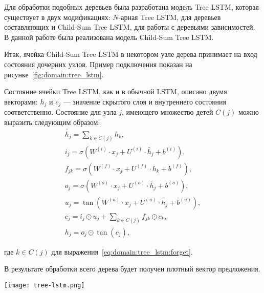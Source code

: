 Для обработки подобных деревьев была разработана модель Tree LSTM, которая существует в двух модификациях: $N$-арная Tree LSTM, для деревьев составляющих и Child-Sum Tree LSTM, для работы с деревьями зависимостей. В данной работе была реализована модель Child-Sum Tree LSTM\cite{tree_lstm}.

Итак, ячейка Child-Sum Tree LSTM в некотором узле дерева принимает на вход состояния дочерних узлов. Пример подключения показан на рисунке~\ref{fig:domain:tree_lstm}.

Состояние ячейки Tree LSTM, как и в обычной LSTM, описано двумя векторами: $h_j$ и $c_j$ --- значение скрытого слоя и внутреннего состояния соответственно. Состояние для узла $j$, имеющего множество детей $C(j)$ можно выразить следующим образом:
\begin{gather}
  \tilde{h_j} = \sum_{k\in{C(j)}}h_k,\\
  i_j = \sigma(W^{(i)}\cdot{x_j} + U^{(i)}\cdot{\tilde{h_j}} + b^{(i)}),\\
  \label{eq:domain:tree_lstm:forget}
  f_{jk} = \sigma(W^{(f)}\cdot{x_j} + U^{(f)}\cdot{h_k} + b^{(f)}),\\
  o_j = \sigma(W^{(o)}\cdot{x_j} + U^{(o)}\cdot{\tilde{h_j}} + b^{(o)}),\\
  u_j = \tan(W^{(u)}\cdot{x_j} + U^{(u)}\cdot{\tilde{h_j}} + b^{(u)}),\\
  c_j = i_j\odot{u_j} + \sum_{k\in{C(j)}}f_{jk}\odot{c_k},\\
  h_j = o_j\odot{\tan(c_j)},
\end{gather}
\begin{explanationx}
\item [где] $k\in{C(j)}$ для выражения~\ref{eq:domain:tree_lstm:forget}.
\end{explanationx}

В результате обработки всего дерева будет получен плотный вектор предложения.

\begin{center}
  \texttt{[image: tree-lstm.png]}
  \label{fig:domain:tree_lstm}
\end{center}


